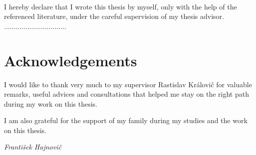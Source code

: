 \documentclass[a4paper]{article}
\numberwithin{algorithm}{section}
\numberwithin{figure}{section}
\numberwithin{table}{section}
\numberwithin{equation}{section}
\begin{document}
    \pagebreak

	
    
    \pagebreak
    
	
    
    \pagebreak

    {~}\vfill

    I hereby declare that I wrote this thesis by myself, only with the help of the referenced literature, under the careful supervision of my thesis advisor.
    \vskip 1cm
    \hfill ................................

    \pagebreak

    \section*{Acknowledgements}
    I would like to thank very much to my supervisor Rastislav Královič for valuable remarks, useful advices and consultations that helped me stay on the right path during my work on this thesis.
    
    \hspace{40pt} I am also grateful for the support of my family during my studies and the work on this thesis.

	\vspace{1cm}    
    
    \hspace{\fill} \textit{František Hajnovič}

    \pagebreak
\end{document}
